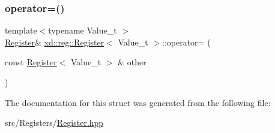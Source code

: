 \subsubsection{\texorpdfstring{operator=()}{operator=()}}
{\footnotesize\ttfamily template$<$typename Value\+\_\+t $>$ \\
\mbox{\hyperlink{structxd_1_1reg_1_1_register}{Register}}\& \mbox{\hyperlink{structxd_1_1reg_1_1_register}{xd\+::reg\+::\+Register}}$<$ Value\+\_\+t $>$\+::operator= (\begin{DoxyParamCaption}\item[{const \mbox{\hyperlink{structxd_1_1reg_1_1_register}{Register}}$<$ Value\+\_\+t $>$ \&}]{other }\end{DoxyParamCaption})\hspace{0.3cm}{\ttfamily [inline]}}



The documentation for this struct was generated from the following file\+:\begin{DoxyCompactItemize}
\item 
src/\+Registers/\mbox{\hyperlink{_register_8hpp}{Register.\+hpp}}\end{DoxyCompactItemize}
